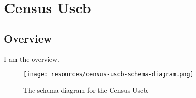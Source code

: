 
\section{Census Uscb}
\label{sec:census-uscb}
\subsection{Overview}
\label{ssec:overview}

I am the overview.

\begin{figure}[h!]
  \begin{center}
    \texttt{[image: resources/census-uscb-schema-diagram.png]}
  \end{center}
  \caption{The schema diagram for the Census Uscb.}
  \label{fig:ov-diagram}
\end{figure}


